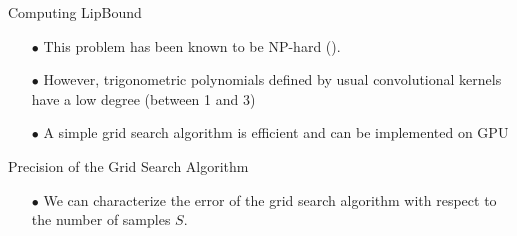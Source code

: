 \begin{frame}{Computing LipBound}
  \begin{itemize}
    \pause
  \item[$\bullet$] This problem has been known to be NP-hard ({}).
    \pause
    \item[$\bullet$] However, trigonometric polynomials defined by usual convolutional kernels have a low degree (between 1 and 3)
    \pause
    \item[$\bullet$] A simple grid search algorithm is efficient and can be implemented on GPU
  \end{itemize}

\end{frame}


\begin{frame}{Precision of the Grid Search Algorithm}

  \begin{itemize}
    \item[$\bullet$] We can characterize the error of the grid search algorithm with respect to the number of samples $S$.
  \end{itemize}


\end{frame}
